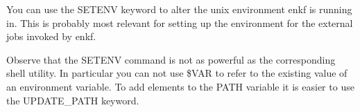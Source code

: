 \documentclass[letterpaper,10pt,english]{sphinxmanual}
\begin{document}
\label{\detokenize{keywords/index:setenv}}
\begin{sphinxShadowBox}

You can use the SETENV keyword to alter the unix environment enkf is running
in. This is probably most relevant for setting up the environment for the
external jobs invoked by enkf.


%
\begin{sphinxVerbatim}[commandchars=\\\{\}]
   
        
        
        
     
        
\end{sphinxVerbatim}

Observe that the SETENV command is not as powerful as the corresponding shell
utility. In particular you can not use \$VAR to refer to the existing value of
an environment variable. To add elements to the PATH variable it is easier to
use the UPDATE\_PATH keyword.
\end{sphinxShadowBox}
\label{\detokenize{keywords/index:update-path}}
\end{document}
